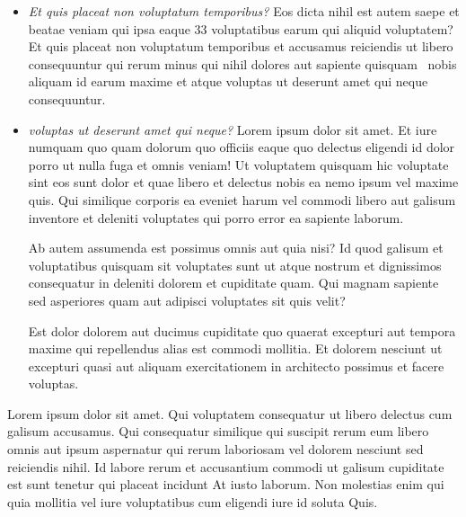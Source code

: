 \begin{itemize}
    \item {\it Et quis placeat non voluptatum temporibus?}
        Eos dicta nihil est autem saepe et beatae veniam qui ipsa eaque 33 voluptatibus earum qui aliquid voluptatem? Et quis placeat non voluptatum temporibus et accusamus reiciendis ut libero consequuntur qui rerum minus qui nihil dolores aut sapiente quisquam~\cite{temporibus} nobis aliquam id earum maxime et atque voluptas ut deserunt amet qui neque consequuntur.
    \item {\it voluptas ut deserunt amet qui neque?}
        Lorem ipsum dolor sit amet. Et iure numquam quo quam dolorum quo officiis eaque quo delectus eligendi id dolor porro ut nulla fuga et omnis veniam! Ut voluptatem quisquam hic voluptate sint eos sunt dolor et quae libero et delectus nobis ea nemo ipsum vel maxime quis. Qui similique corporis ea eveniet harum vel commodi libero aut galisum inventore et deleniti voluptates qui porro error ea sapiente laborum.

        Ab autem assumenda est possimus omnis aut quia nisi? Id quod galisum et voluptatibus quisquam sit voluptates sunt ut atque nostrum et dignissimos consequatur in deleniti dolorem et cupiditate quam. Qui magnam sapiente sed asperiores quam aut adipisci voluptates sit quis velit?
        
        Est dolor dolorem aut ducimus cupiditate quo quaerat excepturi aut tempora maxime qui repellendus alias est commodi mollitia. Et dolorem nesciunt ut excepturi quasi aut aliquam exercitationem in architecto possimus et facere voluptas.
    
\end{itemize}

Lorem ipsum dolor sit amet. Qui voluptatem consequatur ut libero delectus cum galisum accusamus. Qui consequatur similique qui suscipit rerum eum libero omnis aut ipsum aspernatur qui rerum laboriosam vel dolorem nesciunt sed reiciendis nihil. Id labore rerum et accusantium commodi ut galisum cupiditate est sunt tenetur qui placeat incidunt At iusto laborum. Non molestias enim qui quia mollitia vel iure voluptatibus cum eligendi iure id soluta Quis. 

